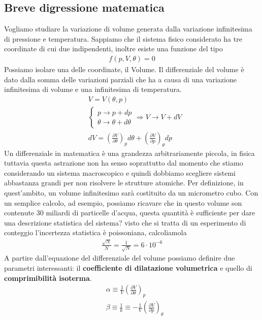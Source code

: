 \documentclass[
10pt, %
a4paper, %
oneside, %
headinclude,footinclude, %
BCOR5mm, %
]{scrartcl}
\begin{document}
\subsection{Breve digressione matematica}
Vogliamo studiare la variazione di volume generata dalla variazione infinitesima di pressione e temperatura. Sappiamo che il sistema fisico considerato ha tre coordinate di cui due indipendenti, inoltre esiste una funzione del tipo
\begin{align*} 
	f(p, V, \theta) = 0
\end{align*} 
Possiamo isolare una delle coordinate, il Volume. Il differenziale del volume è dato dalla somma delle variazioni parziali che ha a causa di una variazione infinitesima di volume e una infinitesima di temperatura. 
\begin{align*} 
	&V = V(\theta, p)\\
	&\begin{cases}
		p\rightarrow p + dp\\
		\theta \rightarrow \theta + d\theta
	\end{cases} \Rightarrow V \rightarrow V + dV\\
	&dV = (\frac{\partial V}{\partial \theta})_p d\theta + (\frac{\partial V}{\partial p})_{\theta} dp
\end{align*} 
Un differenziale in matematica è una grandezza arbitrariamente piccola, in fisica tuttavia questa astrazione non ha senso soprattutto dal momento che stiamo considerando un sistema macroscopico e quindi dobbiamo scegliere sistemi abbastanza grandi per non risolvere le  strutture atomiche. Per definizione, in quest'ambito, un volume infinitesimo sarà costituito da un micrometro cubo. Con un semplice calcolo, ad esempio, possiamo ricavare che in questo volume son contenute 30 miliardi di particelle d'acqua, questa quantità è sufficiente per dare una descrizione statistica del sistema? visto che si tratta di un esperimento di conteggio l'incertezza statistica è poissoniana, calcoliamola
\begin{align*} 
	\frac{\sqrt{N}}{N} = \frac{1}{\sqrt{N}} = 6 \cdot 10^{-6}
\end{align*} 
A partire dall'equazione del differenziale del volume possiamo definire due parametri interessanti: il \textbf{coefficiente di dilatazione volumetrica} e quello di \textbf{comprimibilità isoterma}.
\begin{align*} 
	&\alpha \equiv \frac{1}{V}( \frac{\partial V}{\partial \theta})_p\\
	&\beta \equiv \frac{1}{k} \equiv - \frac{1}{V}( \frac{\partial V}{\partial p})_{\theta}
\end{align*} 
\end{document}
